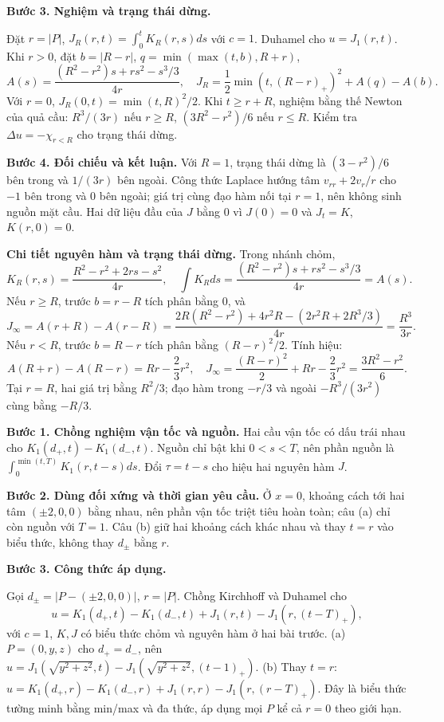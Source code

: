 \textbf{Bước 3. Nghiệm và trạng thái dừng.}

Đặt $r=|P|$, $J_R(r,t)=\int_0^tK_R(r,s)ds$ với $c=1$. Duhamel cho $u=J_1(r,t)$. Khi $r>0$, đặt $b=|R-r|$, $q=\min(\max(t,b),R+r)$,
\[A(s)=\frac{(R^2-r^2)s+rs^2-s^3/3}{4r},\quad J_R=\frac12\min(t,(R-r)_+)^2+A(q)-A(b).\]
Với $r=0$, $J_R(0,t)=\min(t,R)^2/2$. Khi $t\ge r+R$, nghiệm bằng thế Newton của quả cầu: $R^3/(3r)$ nếu $r\ge R$, $(3R^2-r^2)/6$ nếu $r\le R$. Kiểm tra $\Delta u=-\chi_{r<R}$ cho trạng thái dừng.

\textbf{Bước 4. Đối chiếu và kết luận.} Với $R=1$, trạng thái dừng là $(3-r^2)/6$ bên trong và $1/(3r)$ bên ngoài. Công thức Laplace hướng tâm $v_{rr}+2v_r/r$ cho $-1$ bên trong và $0$ bên ngoài; giá trị cùng đạo hàm nối tại $r=1$, nên không sinh nguồn mặt cầu. Hai dữ liệu đầu của $J$ bằng $0$ vì $J(0)=0$ và $J_t=K$, $K(r,0)=0$.

\textbf{Chi tiết nguyên hàm và trạng thái dừng.} Trong nhánh chỏm,
\[K_R(r,s)=\frac{R^2-r^2+2rs-s^2}{4r},\quad
\int K_Rds=\frac{(R^2-r^2)s+rs^2-s^3/3}{4r}=A(s).\]
Nếu $r\ge R$, trước $b=r-R$ tích phân bằng $0$, và
\[J_\infty=A(r+R)-A(r-R)
=\frac{2R(R^2-r^2)+4r^2R-(2r^2R+2R^3/3)}{4r}
=\frac{R^3}{3r}.\]
Nếu $r<R$, trước $b=R-r$ tích phân bằng $(R-r)^2/2$. Tính hiệu:
\[A(R+r)-A(R-r)=Rr-\frac23r^2,\quad
J_\infty=\frac{(R-r)^2}{2}+Rr-\frac23r^2=\frac{3R^2-r^2}{6}.\]
Tại $r=R$, hai giá trị bằng $R^2/3$; đạo hàm trong $-r/3$ và ngoài $-R^3/(3r^2)$ cùng bằng $-R/3$.

\textbf{Bước 1. Chồng nghiệm vận tốc và nguồn.} Hai cầu vận tốc có dấu trái nhau cho $K_1(d_+,t)-K_1(d_-,t)$. Nguồn chỉ bật khi $0<s<T$, nên phần nguồn là $\int_0^{\min(t,T)}K_1(r,t-s)ds$. Đổi $\tau=t-s$ cho hiệu hai nguyên hàm $J$.

\textbf{Bước 2. Dùng đối xứng và thời gian yêu cầu.} Ở $x=0$, khoảng cách tới hai tâm $(\pm2,0,0)$ bằng nhau, nên phần vận tốc triệt tiêu hoàn toàn; câu (a) chỉ còn nguồn với $T=1$. Câu (b) giữ hai khoảng cách khác nhau và thay $t=r$ vào biểu thức, không thay $d_\pm$ bằng $r$.

\textbf{Bước 3. Công thức áp dụng.}

Gọi $d_\pm=|P-(\pm2,0,0)|$, $r=|P|$. Chồng Kirchhoff và Duhamel cho
\[u=K_1(d_+,t)-K_1(d_-,t)+J_1(r,t)-J_1(r,(t-T)_+),\]
với $c=1$, $K,J$ có biểu thức chỏm và nguyên hàm ở hai bài trước.
(a) $P=(0,y,z)$ cho $d_+=d_-$, nên $u=J_1(\sqrt{y^2+z^2},t)-J_1(\sqrt{y^2+z^2},(t-1)_+)$.
(b) Thay $t=r$: $u=K_1(d_+,r)-K_1(d_-,r)+J_1(r,r)-J_1(r,(r-T)_+)$. Đây là biểu thức tường minh bằng min/max và đa thức, áp dụng mọi $P$ kể cả $r=0$ theo giới hạn.

